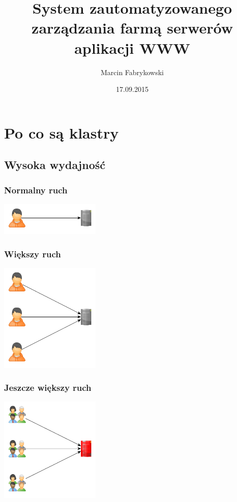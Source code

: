 \documentclass[12pt]{beamer}
\title{System zautomatyzowanego zarządzania farmą serwerów aplikacji WWW}
\author{Marcin Fabrykowski}
\institute{AGH University of Science and Technology}
\date{17.09.2015}
\begin{document}
\frame{\titlepage}
\begin{frame}
\tableofcontents
\end{frame}

\section{Po co są klastry}

\subsection{Wysoka wydajność}
\begin{frame}
\frametitle{Normalny ruch}
\begin{center}
\includegraphics[width=180px]{img/hp1.png}
\end{center}
\end{frame}
\begin{frame}
\frametitle{Większy ruch}
\begin{center}
\includegraphics[width=180px]{img/hp2.png}
\end{center}
\end{frame}
\begin{frame}
\frametitle{Jeszcze większy ruch}
\begin{center}
\includegraphics[width=180px]{img/hp3.png}
\end{center}
\end{frame}
\end{document}
